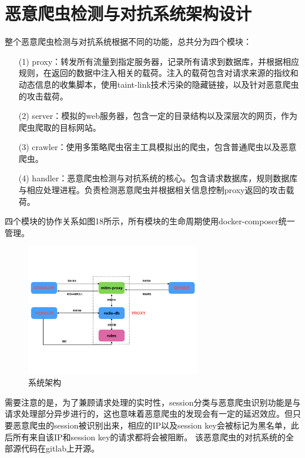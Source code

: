 \documentclass[doctor,privacy,twoside]{buaa_mac}
\begin{document}
\section{恶意爬虫检测与对抗系统架构设计}

整个恶意爬虫检测与对抗系统根据不同的功能，总共分为四个模块：

\begin{itemize}
\item[(1)] proxy：转发所有流量到指定服务器，记录所有请求到数据库，并根据相应规则，在返回的数据中注入相关的载荷。注入的载荷包含对请求来源的指纹和动态信息的收集脚本，使用taint-link技术污染的隐藏链接，以及针对恶意爬虫的攻击载荷。
\item[(2)] server：模拟的web服务器，包含一定的目录结构以及深层次的网页，作为爬虫爬取的目标网站。
\item[(3)] crawler：使用多策略爬虫宿主工具模拟出的爬虫，包含普通爬虫以及恶意爬虫。
\item[(4)] handler：恶意爬虫检测与对抗系统的核心。包含请求数据库，规则数据库与相应处理进程。负责检测恶意爬虫并根据相关信息控制proxy返回的攻击载荷。
\end{itemize}

四个模块的协作关系如图18所示，所有模块的生命周期使用docker-composer统一管理。

\centerline{}
\begin{figure}[!h]
  \centering
  \includegraphics[width=0.68\textwidth]{images/architecture.png}
  \caption{系统架构}
  \label{fig:logo}
\end{figure}
\centerline{}

需要注意的是，为了兼顾请求处理的实时性，session分类与恶意爬虫识别功能是与请求处理部分异步进行的，这也意味着恶意爬虫的发现会有一定的延迟效应。但只要恶意爬虫的session被识别出来，相应的IP以及session key会被标记为黑名单，此后所有来自该IP和session key的请求都将会被阻断。
该恶意爬虫的对抗系统的全部源代码在gitlab上开源。
\end{document}
